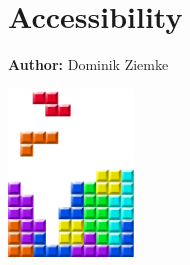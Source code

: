 \chapter{Accessibility }
\label{ch:accessibility}

\hfill \textbf{Author:} Dominik Ziemke

\begin{center} \includegraphics[width=0.25\textwidth, angle=0]{figures/matsimBook.png} \end{center}

